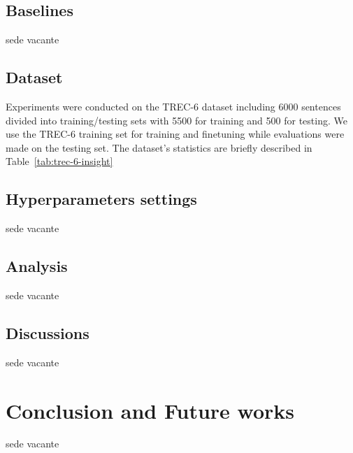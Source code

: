 \documentclass[pdflatex,sn-mathphys]{sn-jnl}%
\theoremstyle{thmstyleone}%
\theoremstyle{thmstyletwo}%
\theoremstyle{thmstylethree}%
\begin{document}
\subsection{Baselines}
sede vacante

\subsection{Dataset}
Experiments were conducted on the TREC-6 dataset including 6000 sentences divided into training/testing sets with 5500 for training and 500 for testing. We use the TREC-6 training set for training and finetuning while evaluations were made on the testing set. The dataset’s statistics are briefly described in Table~\ref{tab:trec-6-insight}

\begin{table}[htp]
\centering
\caption{Insight of the TREC-6 dataset} \label{tab:trec-6-insight}
\end{table}

\subsection{Hyperparameters settings}
sede vacante

\subsection{Analysis}
sede vacante

\subsection{Discussions}
sede vacante

\section{Conclusion and Future works}\label{conclusionandfutureworks}
sede vacante



\end{document}
